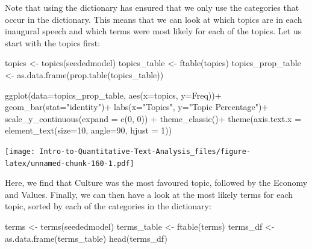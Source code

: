 \documentclass[
]{article}
\newenvironment{Shaded}{\begin{snugshade}}{\end{snugshade}}
\newcommand{\AttributeTok}[1]{\textcolor[rgb]{0.77,0.63,0.00}{#1}}
\newcommand{\DecValTok}[1]{\textcolor[rgb]{0.00,0.00,0.81}{#1}}
\newcommand{\FunctionTok}[1]{\textcolor[rgb]{0.00,0.00,0.00}{#1}}
\newcommand{\NormalTok}[1]{#1}
\newcommand{\OtherTok}[1]{\textcolor[rgb]{0.56,0.35,0.01}{#1}}
\newcommand{\SpecialCharTok}[1]{\textcolor[rgb]{0.00,0.00,0.00}{#1}}
\newcommand{\StringTok}[1]{\textcolor[rgb]{0.31,0.60,0.02}{#1}}
\begin{document}
Note that using the dictionary has ensured that we only use the categories that occur in the dictionary. This means that we can look at which topics are in each inaugural speech and which terms were most likely for each of the topics. Let us start with the topics first:

\begin{Shaded}
\begin{Highlighting}[]
\NormalTok{topics }\OtherTok{\textless{}{-}} \FunctionTok{topics}\NormalTok{(seededmodel)}
\NormalTok{topics\_table }\OtherTok{\textless{}{-}} \FunctionTok{ftable}\NormalTok{(topics)}
\NormalTok{topics\_prop\_table }\OtherTok{\textless{}{-}} \FunctionTok{as.data.frame}\NormalTok{(}\FunctionTok{prop.table}\NormalTok{(topics\_table))}

\FunctionTok{ggplot}\NormalTok{(}\AttributeTok{data=}\NormalTok{topics\_prop\_table, }\FunctionTok{aes}\NormalTok{(}\AttributeTok{x=}\NormalTok{topics, }\AttributeTok{y=}\NormalTok{Freq))}\SpecialCharTok{+}
 \FunctionTok{geom\_bar}\NormalTok{(}\AttributeTok{stat=}\StringTok{"identity"}\NormalTok{)}\SpecialCharTok{+}
 \FunctionTok{labs}\NormalTok{(}\AttributeTok{x=}\StringTok{"Topics"}\NormalTok{, }\AttributeTok{y=}\StringTok{"Topic Percentage"}\NormalTok{)}\SpecialCharTok{+}
 \FunctionTok{scale\_y\_continuous}\NormalTok{(}\AttributeTok{expand =} \FunctionTok{c}\NormalTok{(}\DecValTok{0}\NormalTok{, }\DecValTok{0}\NormalTok{)) }\SpecialCharTok{+}
 \FunctionTok{theme\_classic}\NormalTok{()}\SpecialCharTok{+}
 \FunctionTok{theme}\NormalTok{(}\AttributeTok{axis.text.x =} \FunctionTok{element\_text}\NormalTok{(}\AttributeTok{size=}\DecValTok{10}\NormalTok{, }\AttributeTok{angle=}\DecValTok{90}\NormalTok{, }\AttributeTok{hjust =} \DecValTok{1}\NormalTok{))}
\end{Highlighting}
\end{Shaded}

\texttt{[image: Intro-to-Quantitative-Text-Analysis\_files/figure-latex/unnamed-chunk-160-1.pdf]}

Here, we find that Culture was the most favoured topic, followed by the Economy and Values. Finally, we can then have a look at the most likely terms for each topic, sorted by each of the categories in the dictionary:

\begin{Shaded}
\begin{Highlighting}[]
\NormalTok{terms }\OtherTok{\textless{}{-}} \FunctionTok{terms}\NormalTok{(seededmodel)}
\NormalTok{terms\_table }\OtherTok{\textless{}{-}} \FunctionTok{ftable}\NormalTok{(terms)}
\NormalTok{terms\_df }\OtherTok{\textless{}{-}} \FunctionTok{as.data.frame}\NormalTok{(terms\_table)}
\FunctionTok{head}\NormalTok{(terms\_df)}
\end{Highlighting}
\end{Shaded}
\end{document}
